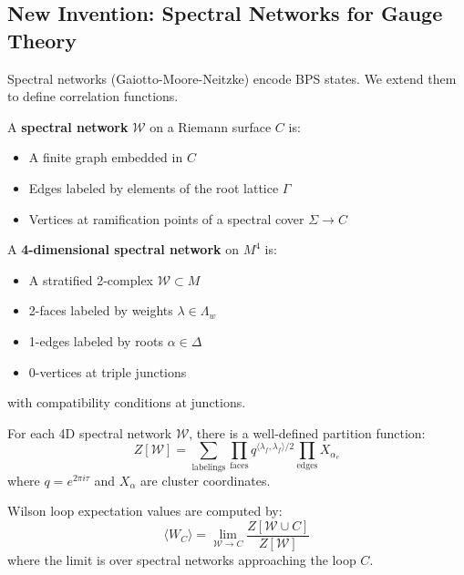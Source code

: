 \subsection{New Invention: Spectral Networks for Gauge Theory}

Spectral networks (Gaiotto-Moore-Neitzke) encode BPS states. We extend them to define correlation functions.

\begin{definition}
A \textbf{spectral network} $\mathcal{W}$ on a Riemann surface $C$ is:
\begin{itemize}
    \item A finite graph embedded in $C$
    \item Edges labeled by elements of the root lattice $\Gamma$
    \item Vertices at ramification points of a spectral cover $\Sigma \to C$
\end{itemize}
\end{definition}

\begin{definition}
A \textbf{4-dimensional spectral network} on $M^4$ is:
\begin{itemize}
    \item A stratified 2-complex $\mathcal{W} \subset M$
    \item 2-faces labeled by weights $\lambda \in \Lambda_w$
    \item 1-edges labeled by roots $\alpha \in \Delta$
    \item 0-vertices at triple junctions
\end{itemize}
with compatibility conditions at junctions.
\end{definition}

\begin{theorem}
For each 4D spectral network $\mathcal{W}$, there is a well-defined partition function:
\[
Z[\mathcal{W}] = \sum_{\text{labelings}} \prod_{\text{faces}} q^{\langle \lambda_f, \lambda_f \rangle / 2} \prod_{\text{edges}} X_{\alpha_e}
\]
where $q = e^{2\pi i \tau}$ and $X_\alpha$ are cluster coordinates.
\end{theorem}

\begin{theorem}
Wilson loop expectation values are computed by:
\[
\langle W_C \rangle = \lim_{\mathcal{W} \to C} \frac{Z[\mathcal{W} \cup C]}{Z[\mathcal{W}]}
\]
where the limit is over spectral networks approaching the loop $C$.
\end{theorem}

